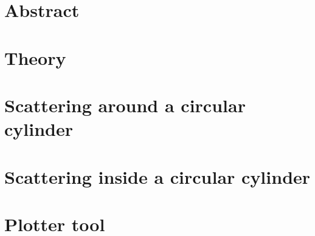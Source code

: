 \documentclass{report}
\begin{document}
    
    

\chapter*{Abstract} 
    


\chapter{Theory}
    


\chapter{Scattering around a circular cylinder}\label{chp:outside}
    

\chapter{Scattering inside a circular cylinder}\label{chp:inside}
  

\chapter{Plotter tool}
    

\printbibliography
{}
\end{document}
